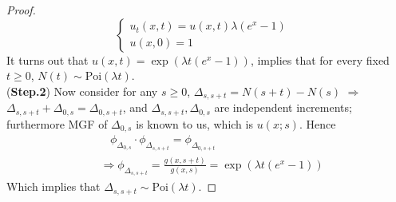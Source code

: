 \documentclass[a4paper, 10pt]{article}
\theoremstyle{definition}
\theoremstyle{hSol}
\begin{document}
\begin{proof}
\begin{equation}
\begin{cases}
  u_t(x,t) = u(x,t)\lambda (e^x-1) & \\
  u(x,0) = 1
  \end{cases}
\end{equation}
It turns out that $u(x,t)=\exp(\lambda t(e^x-1))$, implies that for every fixed $t\geq0$, $N(t)\sim \text{Poi}(\lambda t)$. \\
(\textbf{Step.2}) Now consider for any $s\geq 0$, $\Delta_{s,s+t}=N(s+t)-N(s)$ $\Rightarrow$ $\Delta_{s,s+t}+\Delta_{0,s}=\Delta_{0,s+t}$, and $\Delta_{s,s+t}, \Delta_{0,s}$ are independent increments; furthermore MGF of $\Delta_{0,s}$ is known to us, which is $u(x;s)$. Hence
\begin{equation}
  \begin{split}
    &~~~~ \phi_{\Delta_{0,s}}\cdot \phi_{\Delta_{s,s+t}} = \phi_{\Delta_{0,s+t}}\\
    & \Rightarrow \phi_{\Delta_{s,s+t}} = \frac{g(x,s+t)}{g(x,s)} = \exp(\lambda t(e^x-1))
  \end{split}
\end{equation}
Which implies that $\Delta_{s,s+t} \sim \text{Poi}(\lambda t)$.
\end{proof}
\end{document}

